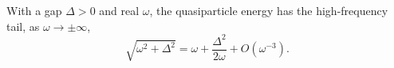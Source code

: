 \documentclass{article}
\begin{document}
With a gap $\Delta>0$ and real $\omega$, the quasiparticle energy has the high-frequency tail, as $\omega\to\pm\infty$,
\begin{equation}
\sqrt{\omega^2+\Delta^2} = \omega + \frac{\Delta^2}{2\omega} + O(\omega^{-3}) .
\label{eq:tail}
\end{equation}
\end{document}
